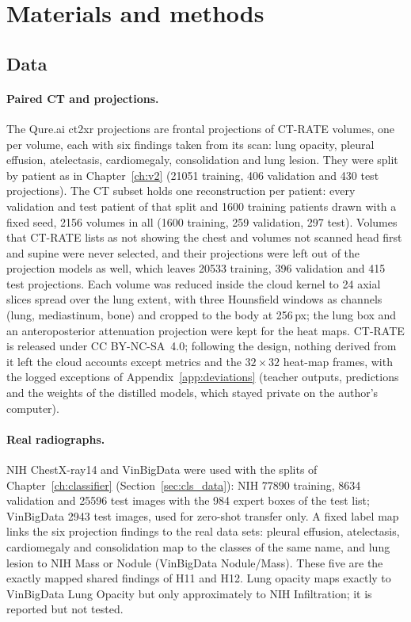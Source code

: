 \section{Materials and methods}
\label{sec:xm_methods}

\subsection{Data}
\label{sec:xm_data}
\paragraph{Paired CT and projections.} The Qure.ai ct2xr projections \citep{angaitkar2026anatomy} are frontal projections of CT-RATE
volumes, one per volume, each with six findings taken from its scan: lung opacity, pleural effusion, atelectasis, cardiomegaly,
consolidation and lung lesion. They were split by patient as in Chapter~\ref{ch:v2} (\num{21051} training, 406 validation and 430 test
projections). The CT subset holds one reconstruction per patient: every validation and test patient of that split and \num{1600} training
patients drawn with a fixed seed, \num{2156} volumes in all (\num{1600} training, 259 validation, 297 test). Volumes that CT-RATE lists as
not showing the chest and volumes not scanned head first and supine were never selected, and their projections were left out of the
projection models as well, which leaves \num{20533} training, 396 validation and 415 test projections. Each volume was reduced inside the
cloud kernel to 24 axial slices spread over the lung extent, with three Hounsfield windows as channels (lung, mediastinum, bone) and
cropped to the body at 256\,px; the lung box and an anteroposterior attenuation projection were kept for the heat maps. CT-RATE is
released under CC BY-NC-SA~4.0; following the design, nothing derived from it left the cloud accounts except metrics and the
$32\times32$ heat-map frames, with the logged exceptions of Appendix~\ref{app:deviations} (teacher outputs, predictions and the weights of
the distilled models, which stayed private on the author's computer).

\paragraph{Real radiographs.} NIH ChestX-ray14 and VinBigData were used with the splits of Chapter~\ref{ch:classifier}
(Section~\ref{sec:cls_data}): NIH \num{77890} training, \num{8634} validation and \num{25596} test images with the 984 expert boxes of the
test list; VinBigData \num{2943} test images, used for zero-shot transfer only. A fixed label map links the six projection findings to
the real data sets: pleural effusion, atelectasis, cardiomegaly and consolidation map to the classes of the same name, and lung lesion to
NIH Mass or Nodule (VinBigData Nodule/Mass). These five are the exactly mapped shared findings of H11 and H12. Lung opacity maps exactly to
VinBigData Lung Opacity but only approximately to NIH Infiltration; it is reported but not tested.

